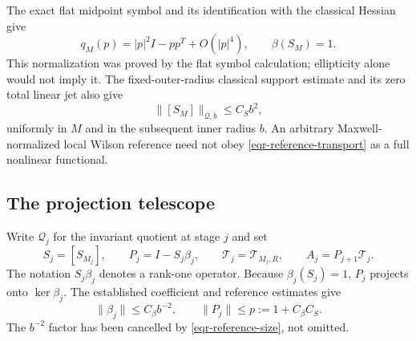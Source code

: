 The exact flat midpoint symbol and its identification with the
classical Hessian give
\begin{equation}
 q_M(p)=|p|^2I-pp^T+O(|p|^4),\qquad \beta(S_M)=1.
 \label{eqr-reference-beta}
\end{equation}
This normalization was proved by the flat symbol calculation;
ellipticity alone would not imply it. The fixed-outer-radius
classical support estimate and its zero total linear jet also give
\begin{equation}
                    \|[S_M]\|_{\mathcal Q,b}\le C_Sb^2,
 \label{eqr-reference-size}
\end{equation}
uniformly in $M$ and in the subsequent inner radius $b$.
An arbitrary Maxwell-normalized local Wilson reference need not obey
\eqref{eqr-reference-transport} as a full nonlinear functional.

\subsection{The projection telescope}
\label{eqr-projection-section}

Write $\mathcal Q_j$ for the invariant quotient at stage $j$ and set
\begin{equation}
 S_j=[S_{M_j}],\qquad
 P_j=I-S_j\beta_j,\qquad
 \mathcal T_j=\mathcal T_{M_j,R},\qquad
 A_j=P_{j+1}\mathcal T_j.
 \label{eqr-projections}
\end{equation}
The notation $S_j\beta_j$ denotes a rank-one operator.
Because $\beta_j(S_j)=1$, $P_j$ projects onto $\ker\beta_j$.
The established coefficient and reference estimates give
\begin{equation}
 \|\beta_j\|\le C_\beta b^{-2},\qquad
 \|P_j\|\le p:=1+C_\beta C_S.
 \label{eqr-projection-norm}
\end{equation}
The $b^{-2}$ factor has been cancelled by
\eqref{eqr-reference-size}, not omitted.

